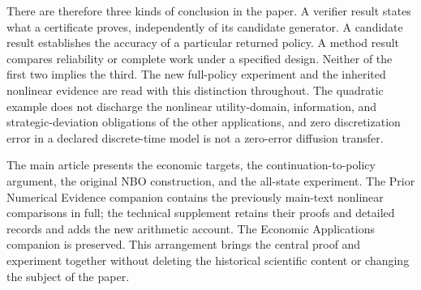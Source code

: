 There are therefore three kinds of conclusion in the paper. A verifier
result states what a certificate proves, independently of its candidate
generator. A candidate result establishes the accuracy of a particular
returned policy. A method result compares reliability or complete work
under a specified design. Neither of the first two implies the third. The
new full-policy experiment and the inherited nonlinear evidence are read
with this distinction throughout. The quadratic example does not discharge
the nonlinear utility-domain, information, and strategic-deviation
obligations of the other applications, and zero discretization error in a
declared discrete-time model is not a zero-error diffusion transfer.

The main article presents the economic targets, the continuation-to-policy
argument, the original NBO construction, and the all-state experiment. The
Prior Numerical Evidence companion contains the previously main-text
nonlinear comparisons in full; the technical supplement retains their
proofs and detailed records and adds the new arithmetic account. The
Economic Applications companion is preserved. This arrangement brings the
central proof and experiment together without deleting the historical
scientific content or changing the subject of the paper.
